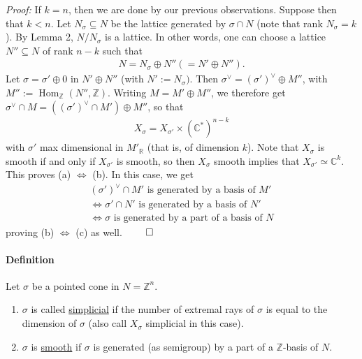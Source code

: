 \documentclass[a4paper,12pt]{amsart}
\newcommand{\ZZ}{\mathbb{Z}}
\newcommand{\RR}{\mathbb{R}}
\newcommand{\CC}{\mathbb{C}}
\DeclareMathOperator{\Hom}{Hom}
\begin{document}
\textit{Proof:} If $k = n$, then we are done by our previous observations. Suppose then that $k < n$. Let $N_\sigma \subseteq N$ be the lattice generated by $\sigma \cap N$ (note that rank $N_\sigma = k$). By Lemma 2, $N/N_\sigma$ is a lattice. In other words, one can choose a lattice $N'' \subseteq N$ of rank $n-k$ such that 
\begin{align*}
	N = N_\sigma \oplus N'' (= N' \oplus N'').
\end{align*}
Let $\sigma = \sigma' \oplus 0$ in $N' \oplus N''$ (with $N' := N_\sigma)$. Then $\sigma^\vee = (\sigma')^\vee \oplus M''$, with $M'' := \Hom_\ZZ(N'', \ZZ)$. Writing $M = M' \oplus M''$, we therefore get $\sigma^\vee \cap M = ((\sigma')^\vee \cap M') \oplus M''$, so that 
\begin{align*}
	X_\sigma = X_{\sigma'} \times (\CC^*)^{n-k}
\end{align*}
with $\sigma'$ max dimensional in $M'_{\RR}$ (that is, of dimension $k$). Note that $X_\sigma$ is smooth if and only if $X_{\sigma'}$ is smooth, so then $X_{\sigma}$ smooth implies that $X_{\sigma'} \simeq \CC^k$. This proves (a) $\iff$ (b). In this case, we get
\begin{align*}
	(\sigma')^\vee \cap M' \text{ is generated by a basis of } M' \\
	\iff \sigma' \cap N' \text{ is generated by a basis of } N' \\
	\iff \sigma \text{ is generated by a part of a basis of } N
\end{align*}
proving (b) $\iff$ (c) as well. $\qed$

\paragraph{Definition}
Let $\sigma$ be a pointed cone in $N = \ZZ^n$. 
\begin{enumerate}
	\item $\sigma$ is called \underline{simplicial} if the number of extremal rays of $\sigma$ is equal to the dimension of $\sigma$ (also call $X_\sigma$ simplicial in this case).
	\item $\sigma$ is \underline{smooth} if $\sigma$ is generated (as semigroup) by a part of a $\ZZ$-basis of $N$.
\end{enumerate}
\end{document}
